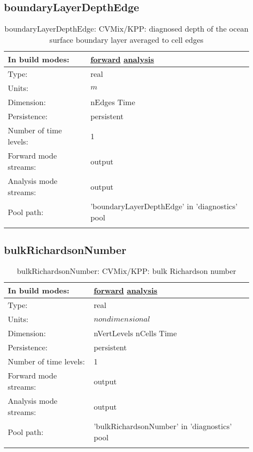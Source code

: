 \subsection[boundaryLayerDepthEdge]{boundaryLayerDepthEdge}
\label{subsec:var_sec_diagnostics_boundaryLayerDepthEdge}
\begin{center}
\begin{longtable}{| p{2.0in} | p{4.0in} |}
        \hline 
        In build modes: & \hyperref[subsec:forward_var_tab_diagnostics]{forward} \hyperref[subsec:analysis_var_tab_diagnostics]{analysis} \\
        \hline 
        Type: & real \\
        \hline 
        Units: & $m$ \\
        \hline 
        Dimension: & nEdges Time \\
        \hline 
        Persistence: & persistent \\
        \hline 
        Number of time levels: & 1 \\
        \hline 
		 Forward mode streams: &  output \\
        \hline 
		 Analysis mode streams: &  output \\
        \hline 
            Pool path: & 'boundaryLayerDepthEdge' in 'diagnostics' pool
 \\
		 \hline 
    \caption{boundaryLayerDepthEdge: CVMix/KPP: diagnosed depth of the ocean surface boundary layer averaged to cell edges}
\end{longtable}
\end{center}
\subsection[bulkRichardsonNumber]{bulkRichardsonNumber}
\label{subsec:var_sec_diagnostics_bulkRichardsonNumber}
\begin{center}
\begin{longtable}{| p{2.0in} | p{4.0in} |}
        \hline 
        In build modes: & \hyperref[subsec:forward_var_tab_diagnostics]{forward} \hyperref[subsec:analysis_var_tab_diagnostics]{analysis} \\
        \hline 
        Type: & real \\
        \hline 
        Units: & $nondimensional$ \\
        \hline 
        Dimension: & nVertLevels nCells Time \\
        \hline 
        Persistence: & persistent \\
        \hline 
        Number of time levels: & 1 \\
        \hline 
		 Forward mode streams: &  output \\
        \hline 
		 Analysis mode streams: &  output \\
        \hline 
            Pool path: & 'bulkRichardsonNumber' in 'diagnostics' pool
 \\
		 \hline 
    \caption{bulkRichardsonNumber: CVMix/KPP: bulk Richardson number}
\end{longtable}
\end{center}
